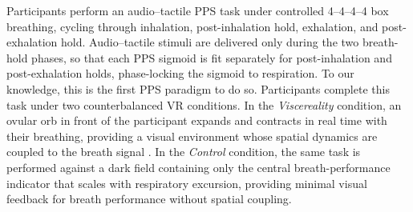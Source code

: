 Participants perform an audio--tactile PPS task \citep{Canzoneri2012, teneggi2013social} under controlled 4--4--4--4 box breathing, cycling through inhalation, post-inhalation hold, exhalation, and post-exhalation hold. Audio--tactile stimuli are delivered only during the two breath-hold phases, so that each PPS sigmoid is fit separately for post-inhalation and post-exhalation holds, phase-locking the sigmoid to respiration. To our knowledge, this is the first PPS paradigm to do so. Participants complete this task under two counterbalanced VR conditions. In the \emph{Viscereality} condition, an ovular orb in front of the participant expands and contracts in real time with their breathing, providing a visual environment whose spatial dynamics are coupled to the breath signal \citep{Goral2024}. In the \emph{Control} condition, the same task is performed against a dark field containing only the central breath-performance indicator that scales with respiratory excursion, providing minimal visual feedback for breath performance without spatial coupling.

